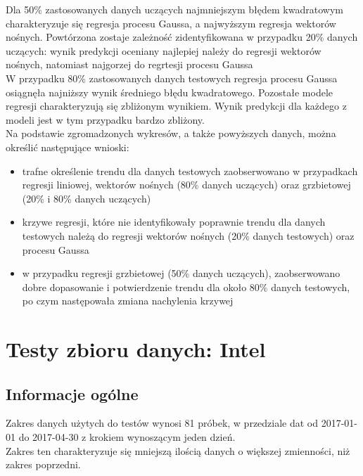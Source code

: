 Dla 50\% zastosowanych danych uczących najmniejszym błędem kwadratowym charakteryzuje się regresja procesu Gaussa, a najwyższym regresja wektorów nośnych.
Powtórzona zostaje zależność zidentyfikowana w przypadku 20\% danych uczących: wynik predykcji oceniany najlepiej należy do regresji wektorów nośnych, natomiast najgorzej do regrtesji procesu Gaussa\\

W przypadku 80\% zastosowanych danych testowych regresja procesu Gaussa osiągnęła najniższy wynik średniego błędu kwadratowego. Pozostałe modele regresji charakteryzują się zbliżonym wynikiem.
Wynik predykcji dla każdego z modeli jest w tym przypadku bardzo zbliżony.\\

Na podstawie zgromadzonych wykresów, a także powyższych danych, można określić następujące wnioski:
\begin{itemize}
 \item trafne określenie trendu dla danych testowych zaobserwowano w przypadkach regresji liniowej, wektorów nośnych (80\% danych uczących) oraz grzbietowej (20\% i 80\% danych uczących)
 \item krzywe regresji, które nie identyfikowały poprawnie trendu dla danych testowych należą do regresji wektorów nośnych (20\% danych testowych) oraz procesu Gaussa
 \item w przypadku regresji grzbietowej (50\% danych uczących), zaobserwowano dobre dopasowanie i potwierdzenie trendu dla około 80\% danych testowych, po czym następowała zmiana nachylenia krzywej
\end{itemize}


\section{Testy zbioru danych: Intel}

\subsection{Informacje ogólne}
Zakres danych użytych do testów wynosi 81 próbek, w przedziale dat od 2017-01-01 do 2017-04-30 z krokiem wynoszącym jeden dzień.\\
Zakres ten charakteryzuje się mniejszą ilością danych o większej zmienności, niż zakres poprzedni.

